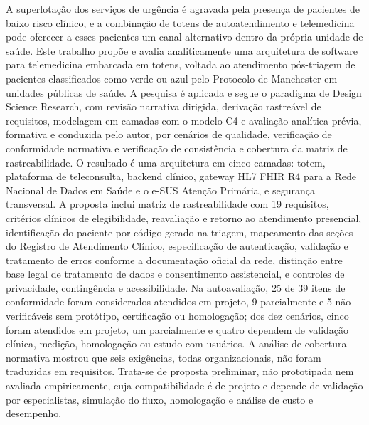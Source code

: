 A superlotação dos serviços de urgência é agravada pela presença de pacientes de baixo risco clínico, e a combinação de totens de autoatendimento e telemedicina pode oferecer a esses pacientes um canal alternativo dentro da própria unidade de saúde. Este trabalho propõe e avalia analiticamente uma arquitetura de software para telemedicina embarcada em totens, voltada ao atendimento pós-triagem de pacientes classificados como verde ou azul pelo Protocolo de Manchester em unidades públicas de saúde. A pesquisa é aplicada e segue o paradigma de Design Science Research, com revisão narrativa dirigida, derivação rastreável de requisitos, modelagem em camadas com o modelo C4 e avaliação analítica prévia, formativa e conduzida pelo autor, por cenários de qualidade, verificação de conformidade normativa e verificação de consistência e cobertura da matriz de rastreabilidade. O resultado é uma arquitetura em cinco camadas: totem, plataforma de teleconsulta, backend clínico, gateway HL7 FHIR R4 para a Rede Nacional de Dados em Saúde e o e-SUS Atenção Primária, e segurança transversal. A proposta inclui matriz de rastreabilidade com 19 requisitos, critérios clínicos de elegibilidade, reavaliação e retorno ao atendimento presencial, identificação do paciente por código gerado na triagem, mapeamento das seções do Registro de Atendimento Clínico, especificação de autenticação, validação e tratamento de erros conforme a documentação oficial da rede, distinção entre base legal de tratamento de dados e consentimento assistencial, e controles de privacidade, contingência e acessibilidade. Na autoavaliação, 25 de 39 itens de conformidade foram considerados atendidos em projeto, 9 parcialmente e 5 não verificáveis sem protótipo, certificação ou homologação; dos dez cenários, cinco foram atendidos em projeto, um parcialmente e quatro dependem de validação clínica, medição, homologação ou estudo com usuários. A análise de cobertura normativa mostrou que seis exigências, todas organizacionais, não foram traduzidas em requisitos. Trata-se de proposta preliminar, não prototipada nem avaliada empiricamente, cuja compatibilidade é de projeto e depende de validação por especialistas, simulação do fluxo, homologação e análise de custo e desempenho.
